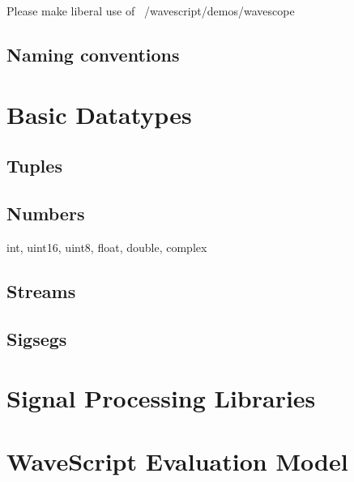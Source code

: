 Please make liberal use of ~/wavescript/demos/wavescope

\section{Naming conventions}


\chapter{Basic Datatypes}

\section{Tuples}

\section{Numbers}

int, uint16, uint8, float, double, complex 




\section{Streams}

\section{Sigsegs}

\chapter{Signal Processing Libraries}



\chapter{WaveScript Evaluation Model}





